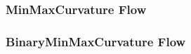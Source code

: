 


\subsubsection{MinMaxCurvature Flow}
\label{sec:MinMaxCurvatureFlowImageFilter}





\subsubsection{BinaryMinMaxCurvature Flow}
\label{sec:BinaryMinMaxCurvatureFlowImageFilter}



